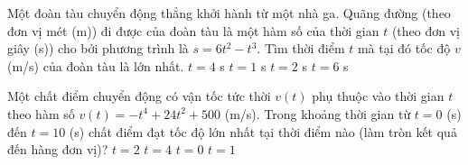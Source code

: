 \begin{ex}%
	Một đoàn tàu chuyển động thẳng khởi hành từ một nhà ga. Quãng đường (theo đơn vị mét (m)) đi được của đoàn tàu là một hàm số của thời gian $t$ (theo đơn vị giây (s)) cho bởi phương trình là $s=6t^2-t^3$. Tìm thời điểm $t$ mà tại đó tốc độ $v$(m/s) của đoàn tàu là  lớn nhất.
	\choice 
		{$t=4$  s}
		{$t=1$ s} 
		{\True  $t=2$ s}
		{$t=6$  s}
\end{ex}

\begin{ex}%
	 Một chất điểm chuyển động có vận tốc tức thời $v(t)$ phụ thuộc vào thời gian $t$ theo hàm số $v(t)=-t^4+24t^2+500$ (m/s). Trong khoảng thời gian từ $t=0$ (s) đến $t=10$ (s) chất điểm đạt tốc độ lớn nhất tại thời điểm nào (làm tròn kết quả đến hàng đơn vị)?
	 \choice
		 {$t=2$}
		 {\True $t=4$}
		{$t=0$} 
		 {$t=1$}
\end{ex}

